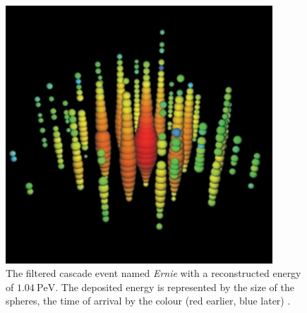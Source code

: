 \begin{figure}
    \centering
    \includegraphics[width=10cm]{Plots/01_7_icecube/cascade.png}
    \caption{The filtered cascade event named \textit{Ernie} with a reconstructed energy of $\SI{1.04}{\peta\electronvolt}$. The deposited energy is represented by the size of the spheres, the time of arrival by the colour (red earlier, blue later) \cite{spiering}.}
    \label{fig:cascade}
\end{figure}
